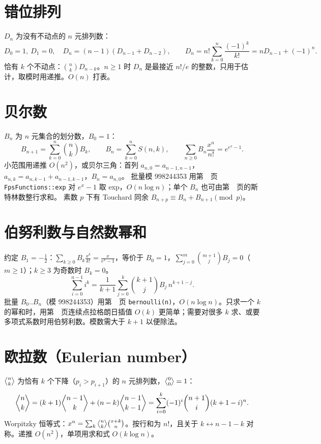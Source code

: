 \section{错位排列}\label{knowledge-derangement}
$D_n$ 为没有不动点的 $n$ 元排列数：
\[
D_0=1,\ D_1=0,\quad D_n=(n-1)(D_{n-1}+D_{n-2}),\qquad D_n=n!\sum_{k=0}^{n}\frac{(-1)^k}{k!}=nD_{n-1}+(-1)^n.
\]
恰有 $k$ 个不动点：$\binom nk D_{n-k}$。$n\ge1$ 时 $D_n$ 是最接近 $n!/e$ 的整数，只用于估计，取模时用递推。$O(n)$ 打表。

\section{贝尔数}\label{knowledge-bell}
$B_n$ 为 $n$ 元集合的划分数，$B_0=1$：
\[
B_{n+1}=\sum_{k=0}^{n}\binom nk B_k,\qquad B_n=\sum_{k=0}^{n}S(n,k),\qquad \sum_{n\ge0}B_n\frac{x^n}{n!}=e^{e^x-1}.
\]
小范围用递推 $O(n^2)$，或贝尔三角：首列 $a_{n,0}=a_{n-1,n-1}$，$a_{n,k}=a_{n,k-1}+a_{n-1,k-1}$，$B_n=a_{n,0}$。
批量模 998244353 用第~\pageref{compact-FpsFunctions}~页 \texttt{FpsFunctions::exp} 对 $e^x-1$ 取 exp，$O(n\log n)$；单个 $B_n$ 也可由第~\pageref{compact-stirling_second_row}~页的斯特林数整行求和。
素数 $p$ 下有 Touchard 同余 $B_{n+p}\equiv B_n+B_{n+1}\pmod p$。

\section{伯努利数与自然数幂和}\label{knowledge-bernoulli}
约定 $B_1=-\tfrac12$：$\displaystyle\sum_{k\ge0}B_k\frac{x^k}{k!}=\frac{x}{e^x-1}$，等价于 $B_0=1$，$\sum_{j=0}^{m}\binom{m+1}{j}B_j=0$（$m\ge1$）；$k\ge3$ 为奇数时 $B_k=0$。
\[
\sum_{i=0}^{n-1}i^k=\frac{1}{k+1}\sum_{j=0}^{k}\binom{k+1}{j}B_j\,n^{k+1-j}.
\]
批量 $B_0..B_n$（模 998244353）用第~\pageref{compact-bernoulli}~页 \texttt{bernoulli(n)}，$O(n\log n)$。只求一个 $k$ 的幂和时，用第~\pageref{compact-lagrange_consecutive}~页连续点拉格朗日插值 $O(k)$ 更简单；需要对很多 $k$ 求、或要多项式系数时用伯努利数。模数需大于 $k+1$ 以便除法。

\section{欧拉数（Eulerian number）}\label{knowledge-eulerian}
$\genfrac{\langle}{\rangle}{0pt}{}{n}{k}$ 为恰有 $k$ 个下降（$p_i>p_{i+1}$）的 $n$ 元排列数，$\genfrac{\langle}{\rangle}{0pt}{}{0}{0}=1$：
\[
\genfrac{\langle}{\rangle}{0pt}{}{n}{k}=(k+1)\genfrac{\langle}{\rangle}{0pt}{}{n-1}{k}+(n-k)\genfrac{\langle}{\rangle}{0pt}{}{n-1}{k-1}
=\sum_{i=0}^{k}(-1)^i\binom{n+1}{i}(k+1-i)^n.
\]
Worpitzky 恒等式：$x^n=\sum_{k}\genfrac{\langle}{\rangle}{0pt}{}{n}{k}\binom{x+k}{n}$。按行和为 $n!$，且关于 $k\leftrightarrow n-1-k$ 对称。递推 $O(n^2)$，单项用求和式 $O(k\log n)$。

